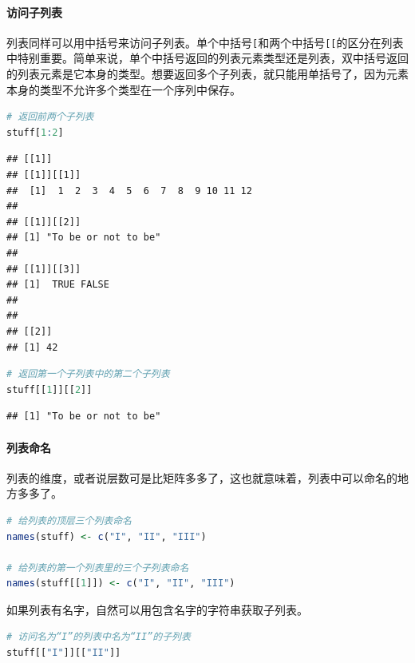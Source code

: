 \documentclass[]{ctexbook}
\let\oldparagraph\paragraph
\renewcommand{\paragraph}[1]{\oldparagraph{#1}\mbox{}}
\newcommand{\passthrough}[1]{#1}
\begin{document}
\hypertarget{ux8bbfux95eeux5b50ux5217ux8868}{%
\paragraph{访问子列表}\label{ux8bbfux95eeux5b50ux5217ux8868}}

列表同样可以用中括号来访问子列表。单个中括号\passthrough{\lstinline![!}和两个中括号\passthrough{\lstinline![[!}的区分在列表中特别重要。简单来说，单个中括号返回的列表元素类型还是列表，双中括号返回的列表元素是它本身的类型。想要返回多个子列表，就只能用单括号了，因为元素本身的类型不允许多个类型在一个序列中保存。

\begin{lstlisting}[language=R]
# 返回前两个子列表
stuff[1:2]
\end{lstlisting}

\begin{lstlisting}
## [[1]]
## [[1]][[1]]
##  [1]  1  2  3  4  5  6  7  8  9 10 11 12
## 
## [[1]][[2]]
## [1] "To be or not to be"
## 
## [[1]][[3]]
## [1]  TRUE FALSE
## 
## 
## [[2]]
## [1] 42
\end{lstlisting}

\begin{lstlisting}[language=R]
# 返回第一个子列表中的第二个子列表
stuff[[1]][[2]]
\end{lstlisting}

\begin{lstlisting}
## [1] "To be or not to be"
\end{lstlisting}

\hypertarget{ux5217ux8868ux547dux540d}{%
\paragraph{列表命名}\label{ux5217ux8868ux547dux540d}}

列表的维度，或者说层数可是比矩阵多多了，这也就意味着，列表中可以命名的地方多多了。

\begin{lstlisting}[language=R]
# 给列表的顶层三个列表命名
names(stuff) <- c("I", "II", "III")

# 给列表的第一个列表里的三个子列表命名
names(stuff[[1]]) <- c("I", "II", "III")
\end{lstlisting}

如果列表有名字，自然可以用包含名字的字符串获取子列表。

\begin{lstlisting}[language=R]
# 访问名为“I”的列表中名为“II”的子列表
stuff[["I"]][["II"]]
\end{lstlisting}
\end{document}
